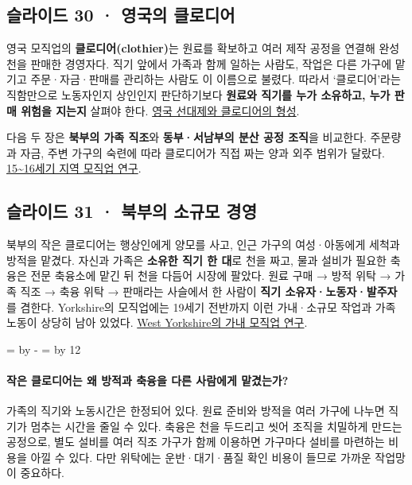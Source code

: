 \documentclass[10pt,a4paper]{article}
\newcommand{\ReserveQuestionSpace}{%
  \par\begingroup
  \dimen0=\pagegoal \advance\dimen0 by -\pagetotal
  \dimen2=\baselineskip \multiply\dimen2 by 12
  \ifdim\dimen0<\dimen2 \newpage\fi
  \endgroup}
\begin{document}
\subsection{슬라이드 30 · 영국의 클로디어}
영국 모직업의 \textbf{클로디어(clothier)}는 원료를 확보하고 여러 제작 공정을 연결해 완성 천을 판매한 경영자다. 직기 앞에서 가족과 함께 일하는 사람도, 작업은 다른 가구에 맡기고 주문·자금·판매를 관리하는 사람도 이 이름으로 불렸다. 따라서 ‘클로디어’라는 직함만으로 노동자인지 상인인지 판단하기보다 \textbf{원료와 직기를 누가 소유하고, 누가 판매 위험을 지는지} 살펴야 한다. \href{https://books.fupress.com/chapter/the-origins-of-the-putting-out-or-domestic-system-of-industrial-production-in-england/13612}{영국 선대제와 클로디어의 형성}.\par

다음 두 장은 \textbf{북부의 가족 직조}와 \textbf{동부·서남부의 분산 공정 조직}을 비교한다. 주문량과 자금, 주변 가구의 숙련에 따라 클로디어가 직접 짜는 양과 외주 범위가 달랐다. \href{https://www.cambridge.org/core/journals/rural-history/article/abs/clothiers-century-14501550/FEFB104D6FB9D0C265D7CE711BA79DBE}{15\textasciitilde{}16세기 지역 모직업 연구}.\par

\subsection{슬라이드 31 · 북부의 소규모 경영}
북부의 작은 클로디어는 행상인에게 양모를 사고, 인근 가구의 여성·아동에게 세척과 방적을 맡겼다. 자신과 가족은 \textbf{소유한 직기 한 대}로 천을 짜고, 물과 설비가 필요한 축융은 전문 축융소에 맡긴 뒤 천을 다듬어 시장에 팔았다. 원료 구매 → 방적 위탁 → 가족 직조 → 축융 위탁 → 판매라는 사슬에서 한 사람이 \textbf{직기 소유자·노동자·발주자}를 겸한다. Yorkshire의 모직업에는 19세기 전반까지 이런 가내·소규모 작업과 가족 노동이 상당히 남아 있었다. \href{https://irep.ntu.ac.uk/id/eprint/43310/}{West Yorkshire의 가내 모직업 연구}.\par

\ReserveQuestionSpace
\paragraph{작은 클로디어는 왜 방적과 축융을 다른 사람에게 맡겼는가?}
가족의 직기와 노동시간은 한정되어 있다. 원료 준비와 방적을 여러 가구에 나누면 직기가 멈추는 시간을 줄일 수 있다. 축융은 천을 두드리고 씻어 조직을 치밀하게 만드는 공정으로, 별도 설비를 여러 직조 가구가 함께 이용하면 가구마다 설비를 마련하는 비용을 아낄 수 있다. 다만 위탁에는 운반·대기·품질 확인 비용이 들므로 가까운 작업망이 중요하다.\par
\end{document}
